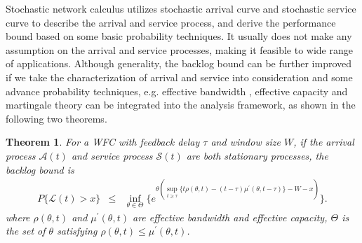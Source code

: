 \documentclass[paper]{ieice}
\newtheorem{theorem}{Theorem}
\begin{document}
Stochastic network calculus utilizes stochastic arrival curve and stochastic service curve to describe the arrival and service process, and derive the performance bound based on some basic probability techniques. It usually does not make any assumption on the arrival and service processes, making it feasible to wide range of applications. Although generality, the backlog bound can be further improved if we take the characterization of arrival and service into consideration and some advance probability techniques, e.g. effective bandwidth \cite{Kelly1996Note}, effective capacity \cite{Wu2003Effective} and martingale theory can be integrated into the analysis framework, as shown in the following two theorems.

\begin{theorem}\label{theorem2}
For a WFC with feedback delay $\tau$ and window size $W$, if the arrival process $\mathcal{A}(t)$ and service process $\mathcal{S}(t)$ are both stationary processes, the backlog bound is
\begin{eqnarray*}\label{eqn4}
P\{\mathcal{L}(t)>x\}&\leq& \inf_{\theta\in \Theta}\{e^{\theta(\sup_{t\geq \tau}\{t\rho(\theta,t)-(t-\tau)\mu^\prime(\theta,t-\tau)\}-W-x)}\}.
\end{eqnarray*}
where $\rho(\theta,t)$ and $\mu^\prime(\theta,t)$ are effective bandwidth and effective capacity, $\Theta$ is the set of $\theta$ satisfying $\rho(\theta,t)\leq \mu^\prime(\theta,t)$.
\end{theorem}
\end{document}
